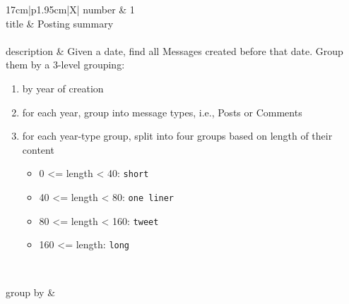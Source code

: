 \renewcommand*{\arraystretch}{1.5}
\noindent\begin{tabularx}{17cm}{|p{1.95cm}|X|}
	\hline
	number      & 1                                                          \\ \hline
	title       & Posting summary                                                           \\ \hline
	 \\ \hline
	description & Given a date, find all Messages created before that date. Group them by
a 3-level grouping:

\begin{enumerate}
\def\labelenumi{\arabic{enumi}.}
\tightlist
\item
  by year of creation
\item
  for each year, group into message types, i.e., Posts or Comments
\item
  for each year-type group, split into four groups based on length of
  their content

  \begin{itemize}
  \tightlist
  \item
    0 \textless{}= length \textless{} 40: \texttt{short}
  \item
    40 \textless{}= length \textless{} 80: \texttt{one\ liner}
  \item
    80 \textless{}= length \textless{} 160: \texttt{tweet}
  \item
    160 \textless{}= length: \texttt{long}
  \end{itemize}
\end{enumerate}
 \\ \hline
	
	group by       &
	\\ \hline
	

\end{tabularx}

